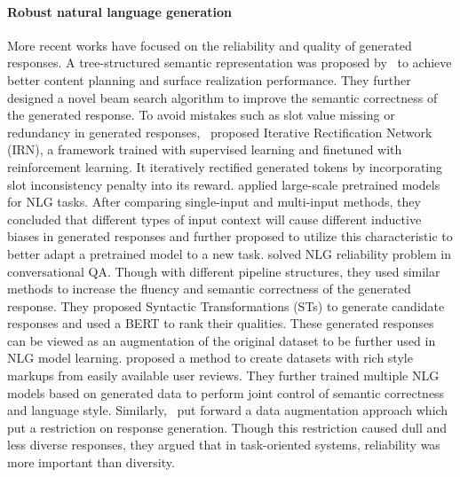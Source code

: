 \paragraph*{Robust natural language generation} More recent works have focused on the reliability and quality of generated responses. A tree-structured semantic representation was proposed by~ to achieve better content planning and surface realization performance. They further designed a novel beam search algorithm to improve the semantic correctness of the generated response. To avoid mistakes such as slot value missing or redundancy in generated responses,~ proposed Iterative Rectification Network (IRN), a framework trained with supervised learning and finetuned with reinforcement learning. It iteratively rectified generated tokens by incorporating slot inconsistency penalty into its reward.  applied large-scale pretrained models for NLG tasks. After comparing single-input and multi-input methods, they concluded that different types of input context will cause different inductive biases in generated responses and further proposed to utilize this characteristic to better adapt a pretrained model to a new task.  solved NLG reliability problem in conversational QA. Though with different pipeline structures, they used similar methods to increase the fluency and semantic correctness of the generated response. They proposed Syntactic Transformations (STs) to generate candidate responses and used a BERT to rank their qualities. These generated responses can be viewed as an augmentation of the original dataset to be further used in NLG model learning.  proposed a method to create datasets with rich style markups from easily available user reviews. They further trained multiple NLG models based on generated data to perform joint control of semantic correctness and language style. Similarly,~ put forward a data augmentation approach which put a restriction on response generation. Though this restriction caused dull and less diverse responses, they argued that in task-oriented systems, reliability was more important than diversity.

